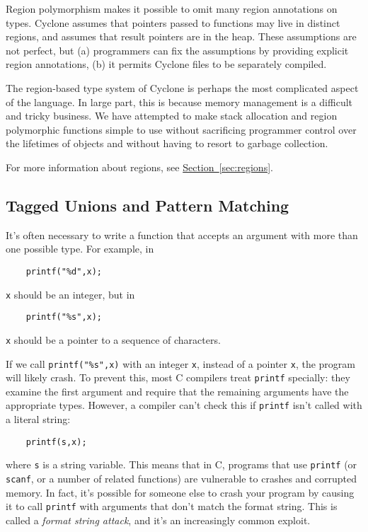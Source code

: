 Region polymorphism makes it possible to omit many region 
annotations on types.  Cyclone assumes that pointers passed
to functions may live in distinct regions, and assumes that
result pointers are in the heap.  These assumptions are not
perfect, but (a) programmers can fix the assumptions by providing
explicit region annotations, (b) it permits Cyclone files
to be separately compiled.

The region-based type system of Cyclone is perhaps the most
complicated aspect of the language.  In large part, this is
because memory management is a difficult and tricky business.
We have attempted to make stack allocation and region polymorphic
functions simple to use without sacrificing programmer control
over the lifetimes of objects and without having to resort to
garbage collection.  

For more information about regions, see
\hyperref[{sec:regions}]{Section~\ref{sec:regions}}.

\subsection{Tagged Unions and Pattern Matching}

It's often necessary to write a function that accepts an argument with
more than one possible type.  For example, in
\begin{verbatim}
    printf("%d",x);
\end{verbatim}
\texttt{x} should be an integer, but in
\begin{verbatim}
    printf("%s",x);
\end{verbatim}
\texttt{x} should be a pointer to a sequence of characters.

If we call \texttt{printf("\%s",x)} with an integer \texttt{x},
instead of a pointer \texttt{x}, the program will likely crash.
To prevent this, most C compilers treat \texttt{printf} specially:
they examine the first argument and require that the remaining
arguments have the appropriate types.  However, a compiler can't check
this if \texttt{printf} isn't called with a literal string:
\begin{verbatim}
    printf(s,x);
\end{verbatim}
where \texttt{s} is a string variable.  This means that in C, programs
that use \texttt{printf} (or \texttt{scanf}, or a number of related
functions) are vulnerable to crashes and corrupted memory.  In fact,
it's possible for someone else to crash your program by causing it to
call \texttt{printf} with arguments that don't match the format
string.  This is called a \emph{format string attack}, and it's an
increasingly common exploit.

